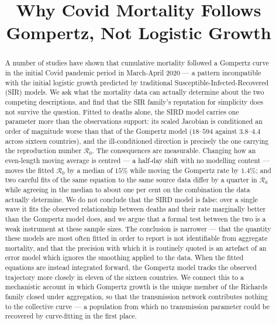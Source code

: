\documentclass{article}
\title{Why Covid Mortality Follows Gompertz, Not Logistic Growth}
\begin{document}
\maketitle

\begin{abstract}
A number of studies have shown that cumulative mortality followed a Gompertz curve in the
initial Covid pandemic period in March-April 2020 --- a pattern incompatible with the
initial logistic growth predicted by traditional Susceptible-Infected-Recovered (SIR)
models. We ask what the mortality data can actually determine about the two competing
descriptions, and find that the SIR family's reputation for simplicity does not survive
the question. Fitted to deaths alone, the SIRD model carries one parameter more than the
observations support: its scaled Jacobian is conditioned an order of magnitude worse than
that of the Gompertz model ($18$--$594$ against $3.8$--$4.4$ across sixteen countries),
and the ill-conditioned direction is precisely the one carrying the reproduction number
$\mathcal{R}_0$. The consequences are measurable. Changing how an even-length moving
average is centred --- a half-day shift with no modelling content --- moves the fitted
$\mathcal{R}_0$ by a median of $15\%$ while moving the Gompertz rate by $1.4\%$; and two
careful fits of the same equation to the same source data differ by a quarter in
$\mathcal{R}_0$ while agreeing in the median to about one per cent on the combination the
data actually determine. We do not conclude that the SIRD model is false: over a single
wave it fits the observed relationship between deaths and their rate marginally better
than the Gompertz model does, and we argue that a formal test between the two is a weak
instrument at these sample sizes. The conclusion is narrower --- that the quantity these
models are most often fitted in order to report is not identifiable from aggregate
mortality, and that the precision with which it is routinely quoted is an artefact of an
error model which ignores the smoothing applied to the data. When the fitted equations
are instead integrated forward, the Gompertz model tracks the observed trajectory more
closely in eleven of the sixteen countries. We connect this to a mechanistic account in
which Gompertz growth is the unique member of the Richards family closed under
aggregation, so that the transmission network contributes nothing to the collective
curve --- a population from which no transmission parameter could be recovered by
curve-fitting in the first place.
\end{abstract}
\end{document}
